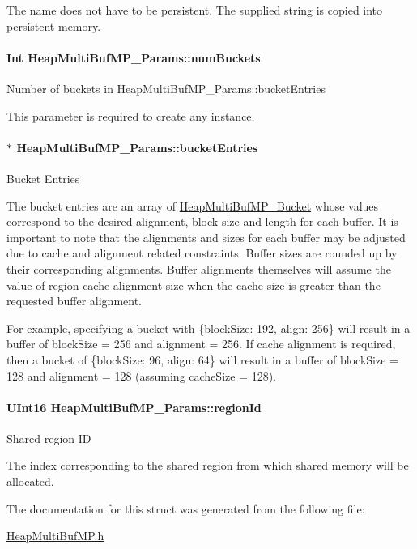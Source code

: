 The name does not have to be persistent. The supplied string is copied into persistent memory. 
\paragraph[{numBuckets}]{\setlength{\rightskip}{0pt plus 5cm}Int {\bf HeapMultiBufMP\_\-Params::numBuckets}}\hfill\label{struct_heap_multi_buf_m_p___params_a30eef328df3b8f69f50a013defb5fbb1}
Number of buckets in HeapMultiBufMP\_\-Params::bucketEntries

This parameter is required to create any instance. 
\paragraph[{bucketEntries}]{$\ast$ {\bf HeapMultiBufMP\_\-Params::bucketEntries}}\hfill\label{struct_heap_multi_buf_m_p___params_ac130e0ad7fad30d9c759af90984dee8b}
Bucket Entries

The bucket entries are an array of \hyperlink{struct_heap_multi_buf_m_p___bucket}{HeapMultiBufMP\_\-Bucket} whose values correspond to the desired alignment, block size and length for each buffer. It is important to note that the alignments and sizes for each buffer may be adjusted due to cache and alignment related constraints. Buffer sizes are rounded up by their corresponding alignments. Buffer alignments themselves will assume the value of region cache alignment size when the cache size is greater than the requested buffer alignment.

For example, specifying a bucket with \{blockSize: 192, align: 256\} will result in a buffer of blockSize = 256 and alignment = 256. If cache alignment is required, then a bucket of \{blockSize: 96, align: 64\} will result in a buffer of blockSize = 128 and alignment = 128 (assuming cacheSize = 128). 
\paragraph[{regionId}]{\setlength{\rightskip}{0pt plus 5cm}UInt16 {\bf HeapMultiBufMP\_\-Params::regionId}}\hfill\label{struct_heap_multi_buf_m_p___params_aa3c641a64db9b4ff0c93f9a0c265f8d7}
Shared region ID

The index corresponding to the shared region from which shared memory will be allocated. 

The documentation for this struct was generated from the following file:\begin{DoxyCompactItemize}
\item 
\hyperlink{_heap_multi_buf_m_p_8h}{HeapMultiBufMP.h}\end{DoxyCompactItemize}
